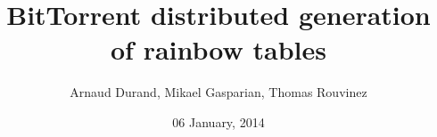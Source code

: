 \documentclass[a4paper]{article}
\begin{document}


\newenvironment{listCustom}{
 \begin{list}{{$\bullet$}}{		%
  \setlength{\partopsep}{0pt}
  \setlength{\parskip}{0pt}
  \setlength{\parsep}{0pt}
  \setlength{\topsep}{5mm}
  \setlength{\itemsep}{1mm}		%
  \setlength{\labelsep}{0.25cm} %
  \setlength{\leftmargin}{2cm}  %
 }
}{
 \end{list}
}

{\setlength{\leftmargini}{2cm} 
\newenvironment{listCustomNumber}{
 \begin{enumerate}{		%
  \setlength{\leftmargin}{2cm}  %
 }
}{
 \end{enumerate}
}

\newcommand*{\xml}[1]{\texttt{<#1>}}

\newcommand*{\webquote}[1]{\textsf{\og #1 \fg{}}}
\renewcommand*\abstractname{Abstract}
\renewcommand*\contentsname{Table of Contents}
	

\title{BitTorrent distributed generation of rainbow tables}

\author{Arnaud Durand, Mikael Gasparian, Thomas Rouvinez}
\date{06 January, 2014}


\rrno{}
\maketitle

\pagebreak


	
\tableofcontents

\pagebreak



}
\end{document}
